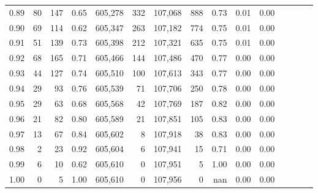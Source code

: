 \begin{tabular}{rrrcrrrrrrrrrrr}
0.89 &      80 &    147 &                                       0.65 &  605,278 &      332 &  107,068 &      888 &  0.73 &  0.01 &                         0.00 \\
0.90 &      69 &    114 &                                       0.62 &  605,347 &      263 &  107,182 &      774 &  0.75 &  0.01 &                         0.00 \\
0.91 &      51 &    139 &                                       0.73 &  605,398 &      212 &  107,321 &      635 &  0.75 &  0.01 &                         0.00 \\
0.92 &      68 &    165 &                                       0.71 &  605,466 &      144 &  107,486 &      470 &  0.77 &  0.00 &                         0.00 \\
0.93 &      44 &    127 &                                       0.74 &  605,510 &      100 &  107,613 &      343 &  0.77 &  0.00 &                         0.00 \\
0.94 &      29 &     93 &                                       0.76 &  605,539 &       71 &  107,706 &      250 &  0.78 &  0.00 &                         0.00 \\
0.95 &      29 &     63 &                                       0.68 &  605,568 &       42 &  107,769 &      187 &  0.82 &  0.00 &                         0.00 \\
0.96 &      21 &     82 &                                       0.80 &  605,589 &       21 &  107,851 &      105 &  0.83 &  0.00 &                         0.00 \\
0.97 &      13 &     67 &                                       0.84 &  605,602 &        8 &  107,918 &       38 &  0.83 &  0.00 &                         0.00 \\
0.98 &       2 &     23 &                                       0.92 &  605,604 &        6 &  107,941 &       15 &  0.71 &  0.00 &                         0.00 \\
0.99 &       6 &     10 &                                       0.62 &  605,610 &        0 &  107,951 &        5 &  1.00 &  0.00 &                         0.00 \\
1.00 &       0 &      5 &                                       1.00 &  605,610 &        0 &  107,956 &        0 &   nan &  0.00 &                         0.00 \\
\bottomrule
\end{tabular}
